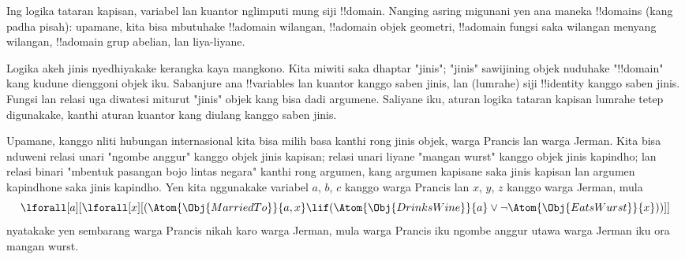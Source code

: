 \documentclass[../../../include/open-logic-section]{subfiles}
\begin{document}


Ing logika tataran kapisan, variabel lan kuantor
nglimputi mung siji !!{domain}. Nanging asring
migunani yen ana maneka !!{domain}s
(kang padha pisah): upamane, kita bisa mbutuhake
!!a{domain} wilangan, !!a{domain} objek geometri,
!!a{domain} fungsi saka wilangan menyang
wilangan, !!a{domain} grup abelian, lan liya-liyane.

Logika akeh jinis nyedhiyakake kerangka kaya
mangkono. Kita miwiti saka dhaptar "jinis";
"jinis" sawijining objek nuduhake
"!!{domain}" kang kudune dienggoni objek iku.
Sabanjure ana !!{variable}s lan kuantor
kanggo saben jinis, lan (lumrahe) siji
!!{identity} kanggo saben jinis. Fungsi
lan relasi uga diwatesi miturut "jinis"
objek kang bisa dadi argumene. Saliyane iku,
aturan logika tataran kapisan lumrahe tetep
digunakake, kanthi aturan kuantor kang
diulang kanggo saben jinis.

Upamane, kanggo nliti hubungan internasional
kita bisa milih basa kanthi rong jinis objek,
warga Prancis lan warga Jerman. Kita bisa
nduweni relasi unari "ngombe anggur" kanggo
objek jinis kapisan; relasi unari liyane
"mangan wurst" kanggo objek jinis kapindho;
lan relasi binari "mbentuk pasangan bojo
lintas negara" kanthi rong argumen, kang
argumen kapisane saka jinis kapisan lan
argumen kapindhone saka jinis kapindho.
Yen kita nggunakake variabel $a$, $b$, $c$
kanggo warga Prancis lan $x$, $y$, $z$
kanggo warga Jerman, mula
\[
\lforall[a][\lforall[x][(\Atom{\Obj{MarriedTo}}{a,x} \lif
(\Atom{\Obj{DrinksWine}}{a} \lor \lnot \Atom{\Obj{EatsWurst}}{x}))]]
\]
nyatakake yen sembarang warga Prancis nikah
karo warga Jerman, mula warga Prancis iku
ngombe anggur utawa warga Jerman iku ora
mangan wurst.
\end{document}
